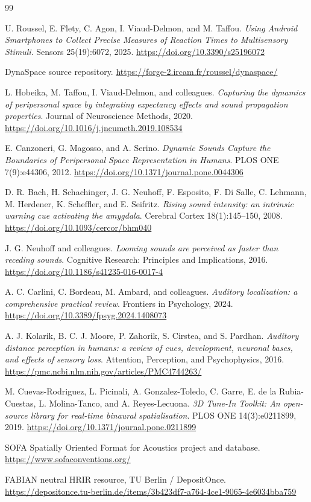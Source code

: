 \documentclass[10pt]{article}
\begin{document}
\clearpage
\begin{thebibliography}{99}

U. Roussel, E. Flety, C. Agon, I. Viaud-Delmon, and M. Taffou.
\textit{Using Android Smartphones to Collect Precise Measures of Reaction Times to Multisensory Stimuli}.
Sensors 25(19):6072, 2025.
\url{https://doi.org/10.3390/s25196072}

DynaSpace source repository.
\url{https://forge-2.ircam.fr/roussel/dynaspace/}

L. Hobeika, M. Taffou, I. Viaud-Delmon, and colleagues.
\textit{Capturing the dynamics of peripersonal space by integrating expectancy effects and sound propagation properties}.
Journal of Neuroscience Methods, 2020.
\url{https://doi.org/10.1016/j.jneumeth.2019.108534}

E. Canzoneri, G. Magosso, and A. Serino.
\textit{Dynamic Sounds Capture the Boundaries of Peripersonal Space Representation in Humans}.
PLOS ONE 7(9):e44306, 2012.
\url{https://doi.org/10.1371/journal.pone.0044306}

D. R. Bach, H. Schachinger, J. G. Neuhoff, F. Esposito, F. Di Salle, C. Lehmann, M. Herdener, K. Scheffler, and E. Seifritz.
\textit{Rising sound intensity: an intrinsic warning cue activating the amygdala}.
Cerebral Cortex 18(1):145--150, 2008.
\url{https://doi.org/10.1093/cercor/bhm040}

J. G. Neuhoff and colleagues.
\textit{Looming sounds are perceived as faster than receding sounds}.
Cognitive Research: Principles and Implications, 2016.
\url{https://doi.org/10.1186/s41235-016-0017-4}

A. C. Carlini, C. Bordeau, M. Ambard, and colleagues.
\textit{Auditory localization: a comprehensive practical review}.
Frontiers in Psychology, 2024.
\url{https://doi.org/10.3389/fpsyg.2024.1408073}

A. J. Kolarik, B. C. J. Moore, P. Zahorik, S. Cirstea, and S. Pardhan.
\textit{Auditory distance perception in humans: a review of cues, development, neuronal bases, and effects of sensory loss}.
Attention, Perception, and Psychophysics, 2016.
\url{https://pmc.ncbi.nlm.nih.gov/articles/PMC4744263/}

M. Cuevas-Rodriguez, L. Picinali, A. Gonzalez-Toledo, C. Garre, E. de la Rubia-Cuestas, L. Molina-Tanco, and A. Reyes-Lecuona.
\textit{3D Tune-In Toolkit: An open-source library for real-time binaural spatialisation}.
PLOS ONE 14(3):e0211899, 2019.
\url{https://doi.org/10.1371/journal.pone.0211899}

SOFA Spatially Oriented Format for Acoustics project and database.
\url{https://www.sofaconventions.org/}

FABIAN neutral HRIR resource, TU Berlin / DepositOnce.
\url{https://depositonce.tu-berlin.de/items/3b423df7-a764-4ce1-9065-4e6034bba759}

\end{thebibliography}
\end{document}

